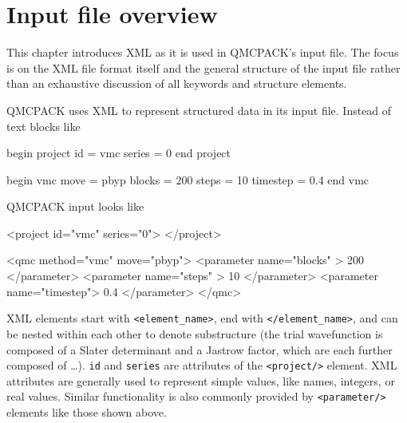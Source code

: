 \chapter{Input file overview}
\label{chap:input_overview}

This chapter introduces XML as it is used in QMCPACK's input file.  The focus is on the XML file format itself and the general structure of the input file rather than an exhaustive discussion of all keywords and structure elements.  

QMCPACK uses XML to represent structured data in its input file.  Instead of text blocks like

\begin{shade}
begin project
  id     = vmc
  series = 0
end project

begin vmc
  move     = pbyp
  blocks   = 200
  steps    =  10
  timestep = 0.4
end vmc
\end{shade} 
QMCPACK input looks like
\begin{shade}
   <project id="vmc" series="0">
   </project>

   <qmc method="vmc" move="pbyp">
      <parameter name="blocks"  >  200 </parameter>
      <parameter name="steps"   >   10 </parameter>
      <parameter name="timestep">  0.4 </parameter>
   </qmc>
\end{shade}
XML elements start with \texttt{<element\_name>}, end with \texttt{</element\_name>}, and can be nested within each other to denote substructure (the trial wavefunction is composed of a Slater determinant and a Jastrow factor, which are each further composed of \ldots).  \texttt{id} and \texttt{series} are attributes of the \texttt{<project/>} element.  XML attributes are generally used to represent simple values, like names, integers, or real values.  Similar functionality is also commonly provided by \texttt{<parameter/>} elements like those shown above.


